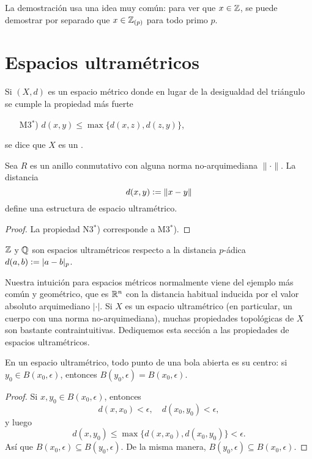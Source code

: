 \documentclass{article}
\numberwithin{equation}{section}
\theoremstyle{definition}
\begin{document}
La demostración usa una idea muy común: para ver que $x\in\mathbb{Z}$, se puede
demostrar por separado que $x\in\mathbb{Z}_{(p)}$ para todo primo $p$.


\section{Espacios ultramétricos}

\begin{definicion}
  Si $(X,d)$ es un espacio métrico donde en lugar de la desigualdad
  del triángulo se cumple la propiedad más fuerte
  \begin{enumerate}
  \item[M3${}^*$)] $d (x,y) \le \max \{ d (x,z), d (z,y) \}$,
  \end{enumerate}
  se dice que $X$ es un .
\end{definicion}

\begin{observacion}
  Sea $R$ es un anillo conmutativo con alguna norma no-arquimediana
  $\|\cdot\|$. La distancia
  $$d (x,y) \mathrel{\mathop:}= \|x-y\|$$
  define una estructura de espacio ultramétrico.

  \begin{proof}
    La propiedad N3${}^*$) corresponde a M3${}^*$).
  \end{proof}
\end{observacion}

\begin{ejemplo}
  $\mathbb{Z}$ y $\mathbb{Q}$ son espacios ultramétricos respecto a la distancia $p$-ádica
  $d (a,b) \mathrel{\mathop:}= |a-b|_p$.
\end{ejemplo}

Nuestra intuición para espacios métricos normalmente viene del ejemplo más común
y geométrico, que es $\mathbb{R}^n$ con la distancia habitual inducida por el valor
absoluto arquimediano $|\cdot|$. Si $X$ es un espacio ultramétrico
(en particular, un cuerpo con una norma no-arquimediana), muchas propiedades
topológicas de $X$ son bastante contraintuitivas. Dediquemos esta sección
a las propiedades de espacios ultramétricos.

\begin{observacion}
  En un espacio ultramétrico, todo punto de una bola abierta es su centro:
  si $y_0 \in B (x_0,\epsilon)$, entonces $B (y_0,\epsilon) = B (x_0,\epsilon)$.

  \begin{proof}
    Si $x, y_0 \in B (x_0,\epsilon)$, entonces
    $$d (x,x_0) < \epsilon, \quad d (x_0,y_0) < \epsilon,$$
    y luego
    $$d (x,y_0) \le \max \{ d (x,x_0), d (x_0,y_0) \} < \epsilon.$$
    Así que $B (x_0,\epsilon) \subseteq B (y_0,\epsilon)$. De la misma manera,
    $B (y_0,\epsilon) \subseteq B (x_0,\epsilon)$.
  \end{proof}
\end{observacion}
\end{document}
